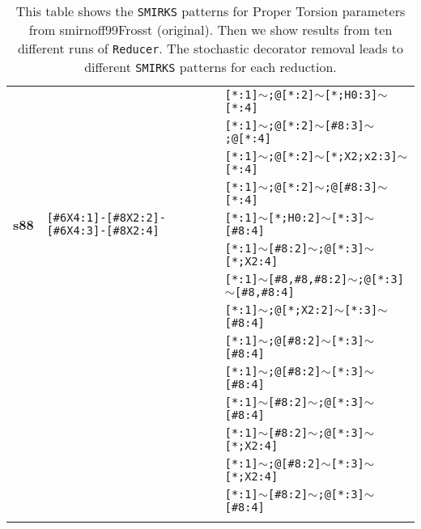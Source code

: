 \begin{longtable}{>{\baselineskip=10pt}p{} >{\baselineskip=10pt}p{} >{\baselineskip=10pt}p{}}
 &  & \texttt{[*:1]$\sim$;@[*:2]$\sim$[*;H0:3]$\sim$[*:4]} \\ 
 &  & \texttt{[*:1]$\sim$;@[*:2]$\sim$[\#8:3]$\sim$;@[*:4]} \\ 
 &  & \texttt{[*:1]$\sim$;@[*:2]$\sim$[*;X2;x2:3]$\sim$[*:4]} \\ 
 &  & \texttt{[*:1]$\sim$;@[*:2]$\sim$;@[\#8:3]$\sim$[*:4]} \\ 
\hline 
\textbf{s88} & \texttt{[\#6X4:1]-[\#8X2:2]-[\#6X4:3]-[\#8X2:4]} & \texttt{[*:1]$\sim$[*;H0:2]$\sim$[*:3]$\sim$[\#8:4]} \\ 
 &  & \texttt{[*:1]$\sim$[\#8:2]$\sim$;@[*:3]$\sim$[*;X2:4]} \\ 
 &  & \texttt{[*:1]$\sim$[\#8,\#8,\#8:2]$\sim$;@[*:3]$\sim$[\#8,\#8:4]} \\ 
 &  & \texttt{[*:1]$\sim$;@[*;X2:2]$\sim$[*:3]$\sim$[\#8:4]} \\ 
 &  & \texttt{[*:1]$\sim$;@[\#8:2]$\sim$[*:3]$\sim$[\#8:4]} \\ 
 &  & \texttt{[*:1]$\sim$;@[\#8:2]$\sim$[*:3]$\sim$[\#8:4]} \\ 
 &  & \texttt{[*:1]$\sim$[\#8:2]$\sim$;@[*:3]$\sim$[\#8:4]} \\ 
 &  & \texttt{[*:1]$\sim$[\#8:2]$\sim$;@[*:3]$\sim$[*;X2:4]} \\ 
 &  & \texttt{[*:1]$\sim$;@[\#8:2]$\sim$[*:3]$\sim$[*;X2:4]} \\ 
 &  & \texttt{[*:1]$\sim$[\#8:2]$\sim$;@[*:3]$\sim$[\#8:4]} \\ 
\hline 
\caption{This table shows the \texttt{SMIRKS} patterns for Proper Torsion parameters from smirnoff99Frosst (original). Then we show results from ten different runs of \texttt{Reducer}. The stochastic decorator removal leads to different \texttt{SMIRKS} patterns for each reduction.}
\label{tab:proper_alkethoh}
\end{longtable}


